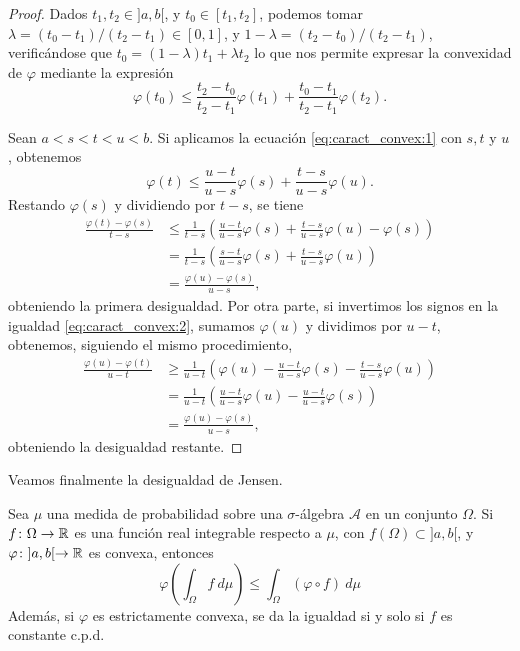 \begin{proof}
    Dados $t_1,t_2 \in ]a,b[$, y $t_0 \in [t_1,t_2]$, podemos tomar $\lambda = (t_0 - t_1)/(t_2 - t_1) \in [0,1]$, y $1- \lambda = (t_2 - t_0)/(t_2 - t_1)$, verificándose que $t_0 = (1 - \lambda)t_1 + \lambda t_2$ lo que nos permite expresar la convexidad de $\varphi$ mediante la expresión
    \begin{equation} \label{eq:caract_convex:1}
        \varphi(t_0) \le \frac{t_2 - t_0}{t_2 - t_1}\varphi(t_1)+\frac{t_0 - t_1}{t_2 - t_1}\varphi(t_2). 
    \end{equation}

    Sean $a < s < t < u < b$. Si aplicamos la ecuación \ref{eq:caract_convex:1} con $s,t$ y $u$, obtenemos
    \begin{equation} \label{eq:caract_convex:2}
        \varphi(t) \le \frac{u - t}{u-s}\varphi(s) + \frac{t-s}{u-s}\varphi(u).
    \end{equation}
    Restando $\varphi(s)$ y dividiendo por $t-s$, se tiene
    \begin{align*}
        \frac{\varphi(t)-\varphi(s)}{t-s} &\le  \frac{1}{t-s}\left(\frac{u - t}{u-s}\varphi(s) + \frac{t-s}{u-s}\varphi(u) - \varphi(s)\right) \\
                    &= \frac{1}{t-s}\left(\frac{s-t}{u-s}\varphi(s) + \frac{t-s}{u-s}\varphi(u) \right) \\
                    &= \frac{\varphi(u)-\varphi(s)}{u - s},
    \end{align*}
    obteniendo la primera desigualdad. Por otra parte, si invertimos los signos en la igualdad \ref{eq:caract_convex:2}, sumamos $\varphi(u)$ y dividimos por $u -t$, obtenemos, siguiendo el mismo procedimiento,
    \begin{align*}
        \frac{\varphi(u)-\varphi(t)}{u - t} &\ge \frac{1}{u-t}\left( \varphi(u) - \frac{u-t}{u-s}\varphi(s) - \frac{t-s}{u-s}\varphi(u)\right) \\
                &= \frac{1}{u-t}\left( \frac{u-t}{u-s}\varphi(u) - \frac{u-t}{u-s}\varphi(s) \right) \\
                &= \frac{\varphi(u) - \varphi(s)}{u-s},
    \end{align*}
    obteniendo la desigualdad restante.
\end{proof}

Veamos finalmente la desigualdad de Jensen.

\begin{thm} \label{thm:desig_jensen}
    Sea $\mu$ una medida de probabilidad sobre una $\sigma$-álgebra $\mathcal{A}$ en un conjunto $\Omega$. Si $f\colon \Omega \to \mathbb{R}$ es una función real integrable respecto a $\mu$, con $f(\Omega) \subset ]a,b[$, y $\varphi\colon ]a,b[ \to \mathbb{R}$ es convexa, entonces
    \begin{equation}
        \varphi\left(\int_{\Omega}f\ d\mu\right) \le \int_{\Omega}(\varphi \circ f)\ d\mu
    \end{equation}
    Además, si $\varphi$ es estrictamente convexa, se da la igualdad si y solo si $f$ es constante c.p.d.
\end{thm}

